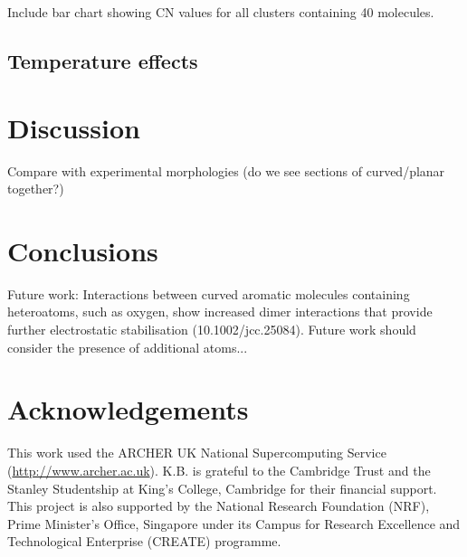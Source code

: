 Include bar chart showing CN values for all clusters containing 40 molecules.




\subsection{Temperature effects}


\section{Discussion}
Compare with experimental morphologies (do we see sections of curved/planar together?)




\section{Conclusions}

Future work:
Interactions between curved aromatic molecules containing heteroatoms, such as oxygen, show increased dimer interactions that provide further electrostatic stabilisation (10.1002/jcc.25084).  Future work should consider the presence of additional atoms...




\section*{Acknowledgements}
This work used the ARCHER UK National Supercomputing Service (\url{http://www.archer.ac.uk}).
K.B. is grateful to the Cambridge Trust and the Stanley Studentship at King's College, Cambridge for their financial support.
This project is also supported by the National Research Foundation (NRF), Prime Minister's Office, Singapore under its Campus for Research Excellence and Technological Enterprise (CREATE) programme.
